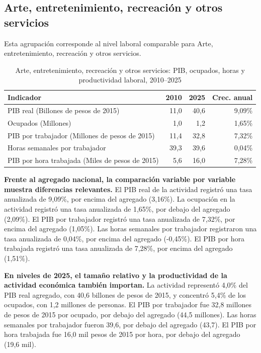 \subsection{Arte, entretenimiento, recreación y otros servicios}

Esta agrupación corresponde al nivel laboral comparable para Arte, entretenimiento, recreación y otros servicios.

\begin{table}[H]
\centering
\caption{Arte, entretenimiento, recreación y otros servicios: PIB, ocupados, horas y productividad laboral, 2010--2025}
\label{tab:agg25_r_s_productividad}
\small
\begin{tabular}{lrrr}
\toprule
Indicador & 2010 & 2025 & Crec. anual \\
\midrule
PIB real  (Billones de pesos de 2015) & 11,0 & 40,6 & 9,09\% \\
Ocupados (Millones) & 1,0 & 1,2 & 1,65\% \\
PIB por trabajador (Millones de pesos de 2015) & 11,4 & 32,8 & 7,32\% \\
Horas semanales por trabajador & 39,3 & 39,6 & 0,04\% \\
PIB por hora trabajada (Miles de pesos de 2015) & 5,6 & 16,0 & 7,28\% \\
\bottomrule
\end{tabular}
\end{table}

\textbf{Frente al agregado nacional, la comparación variable por variable muestra diferencias relevantes.} El PIB real de la actividad registró una tasa anualizada de 9,09\%, por encima del agregado (3,16\%). La ocupación en la actividad registró una tasa anualizada de 1,65\%, por debajo del agregado (2,09\%). El PIB por trabajador registró una tasa anualizada de 7,32\%, por encima del agregado (1,05\%). Las horas semanales por trabajador registraron una tasa anualizada de 0,04\%, por encima del agregado (-0,45\%). El PIB por hora trabajada registró una tasa anualizada de 7,28\%, por encima del agregado (1,51\%).

\textbf{En niveles de 2025, el tamaño relativo y la productividad de la actividad económica también importan.} La actividad representó 4,0\% del PIB real agregado, con 40,6 billones de pesos de 2015, y concentró 5,4\% de los ocupados, con 1,2 millones de personas. El PIB por trabajador fue 32,8 millones de pesos de 2015 por ocupado, por debajo del agregado (44,5 millones). Las horas semanales por trabajador fueron 39,6, por debajo del agregado (43,7). El PIB por hora trabajada fue 16,0 mil pesos de 2015 por hora, por debajo del agregado (19,6 mil).

